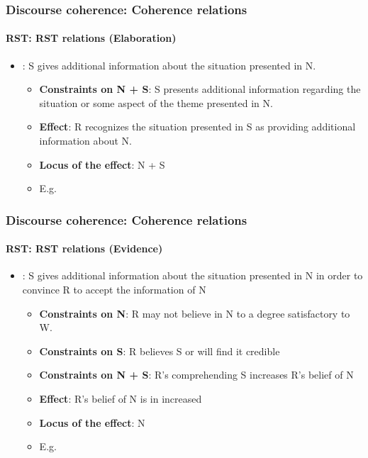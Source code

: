 \documentclass[xcolor=table]{beamer}
\begin{document}
\begin{frame}
	\frametitle{Discourse coherence: Coherence relations}
	\framesubtitle{RST: RST relations (Elaboration)}
	
	\begin{itemize}
		\item {}: S gives additional information about the situation presented in N.
		\begin{itemize}
			\item \textbf{Constraints on N + S}: S presents additional information regarding the situation or some aspect of the theme presented in N.
			\item \textbf{Effect}: R recognizes the situation presented in S as providing additional information about N. 
			\item \textbf{Locus of the effect}: N + S
			\item E.g. 
		\end{itemize}
	\end{itemize}
	
\end{frame}

\begin{frame}
	\frametitle{Discourse coherence: Coherence relations}
	\framesubtitle{RST: RST relations (Evidence)}
	
	\begin{itemize}
		\item {}: S gives additional information about the situation presented in N in order to convince R to accept the information of N
		\begin{itemize}
			\item \textbf{Constraints on N}: R may not believe in N to a degree satisfactory to W.
			\item \textbf{Constraints on S}: R believes S or will find it credible
			\item \textbf{Constraints on N + S}: R's comprehending S increases R's belief of N
			\item \textbf{Effect}: R's belief of N is in increased
			\item \textbf{Locus of the effect}: N
			\item E.g. 
		\end{itemize}
	\end{itemize}
	
\end{frame}
\end{document}
